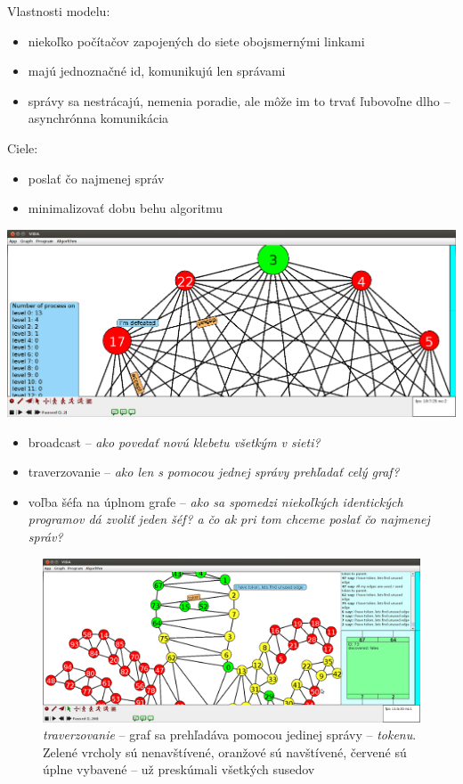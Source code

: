 
Vlastnosti modelu:
\begin{itemize}
    \item niekoľko počítačov zapojených do siete obojsmernými linkami
    \item majú jednoznačné id, komunikujú len správami
    \item správy sa nestrácajú, nemenia poradie, ale môže im to trvať ľubovoľne dlho -- asynchrónna
    komunikácia
\end{itemize}

Ciele:
\begin{itemize}
    \item poslať čo najmenej správ
    \item minimalizovať dobu behu algoritmu
\end{itemize}


\includegraphics[width=\columnwidth]{le}


\begin{itemize}

    \item broadcast -- \textit{ako povedať novú klebetu všetkým v sieti?}
    \item traverzovanie -- \textit{ako len s pomocou jednej správy prehľadať celý graf?}
    \item voľba šéfa na úplnom grafe -- \textit{ako sa spomedzi niekoľkých identických programov
    dá zvoliť jeden šéf? a čo ak pri tom chceme poslať čo najmenej správ?}

\end{itemize}

\noindent
\begin{figure}
\centering
\includegraphics[width=\columnwidth]{traverz}
\caption{\emph{traverzovanie} -- graf sa prehľadáva pomocou jedinej správy -- \emph{tokenu}. Zelené vrcholy
sú nenavštívené, oranžové sú navštívené, červené sú úplne vybavené -- už preskúmali všetkých susedov}
\label{img:historia} 
\end{figure}

